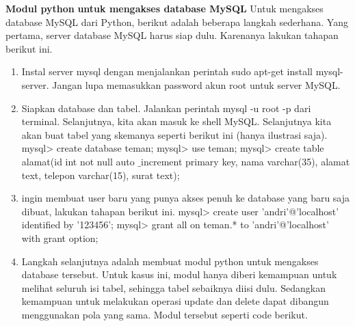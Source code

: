 \vspace{12pt}
\noindent 
\textbf{Modul python}\textbf{ untuk mengakses database MySQL} 
Untuk mengakses database MySQL dari Python, berikut adalah beberapa langkah sederhana. Yang pertama, server database MySQL harus siap dulu. Karenanya lakukan tahapan berikut ini. 
\noindent 
\begin{enumerate}
\item Instal server mysql dengan menjalankan perintah sudo apt-get install mysql-server. Jangan lupa memasukkan password akun root untuk server MySQL. 
\noindent 
\item Siapkan database dan tabel. Jalankan perintah mysql -u root -p dari terminal. Selanjutnya, kita akan masuk ke shell MySQL. Selanjutnya kita akan buat tabel yang skemanya seperti berikut ini (hanya ilustrasi saja). 
mysql> create database teman; 
mysql> use teman; \hspace*{1.69in}  
mysql> create table alamat(id int not null auto $  \_  $increment primary key, nama varchar(35), alamat text, telepon varchar(15), surat text); 
\vspace{12pt}
\noindent 
\item  ingin membuat user baru yang punya akses penuh ke database yang baru saja dibuat, lakukan tahapan berikut ini. 
mysql> create user 'andri'@'localhost' identified by '123456'; 
mysql> grant all on teman.* to 'andri'@'localhost' with grant option; 
\noindent 
\item Langkah selanjutnya adalah membuat modul python untuk mengakses database tersebut. Untuk kasus ini, modul hanya diberi kemampuan untuk melihat seluruh isi tabel, sehingga tabel sebaiknya diisi dulu. Sedangkan kemampuan untuk melakukan operasi update dan delete dapat dibangun menggunakan pola yang sama. Modul tersebut seperti code berikut. 
\end{enumerate}

